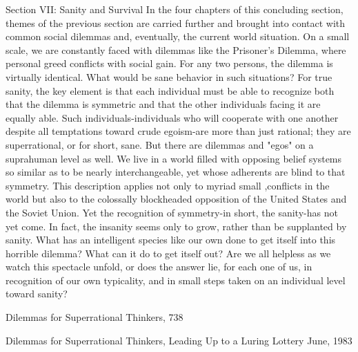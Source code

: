 
                                                               Section VII:
                                                       Sanity and Survival
        In the four chapters of this concluding section, themes of the previous section
are carried further and brought into contact with common social dilemmas and,
eventually, the current world situation. On a small scale, we are constantly faced with
dilemmas like the Prisoner's Dilemma, where personal greed conflicts with social
gain. For any two persons, the dilemma is virtually identical. What would be sane
behavior in such situations? For true sanity, the key element is that each individual
must be able to recognize both that the dilemma is symmetric and that the other
individuals facing it are equally able. Such individuals-individuals who will cooperate
with one another despite all temptations toward crude egoism-are more than just
rational; they are superrational, or for short, sane. But there are dilemmas and "egos"
on a suprahuman level as well. We live in a world filled with opposing belief systems
so similar as to be nearly interchangeable, yet whose adherents are blind to that
symmetry. This description applies not only to myriad small ,conflicts in the world
but also to the colossally blockheaded opposition of the United States and the Soviet
Union. Yet the recognition of symmetry-in short, the sanity-has not yet come. In fact,
the insanity seems only to grow, rather than be supplanted by sanity. What has an
intelligent species like our own done to get itself into this horrible dilemma? What can
it do to get itself out? Are we all helpless as we watch this spectacle unfold, or does
the answer lie, for each one of us, in recognition of our own typicality, and in small
steps taken on an individual level toward sanity?




Dilemmas for Superrational Thinkers,                                                738


                           Dilemmas for
                      Superrational Thinkers,
                   Leading Up to a Luring Lottery
                                        June, 1983


